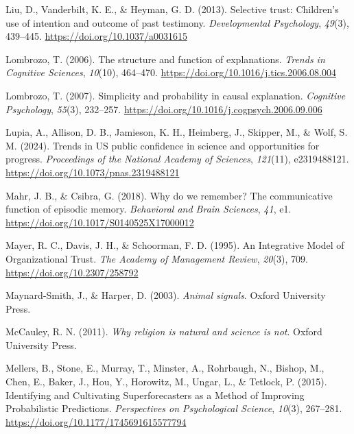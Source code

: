 \documentclass[
  jou,
  floatsintext,
  longtable,
  nolmodern,
  notxfonts,
  notimes,
  colorlinks=true,linkcolor=blue,citecolor=blue,urlcolor=blue]{apa7}
\newlength{\cslhangindent}
\newenvironment{CSLReferences}[2] %
 {\begin{list}{}{%
  \setlength{\itemindent}{0pt}
  \setlength{\leftmargin}{0pt}
  \setlength{\parsep}{0pt}
  \ifodd #1
   \setlength{\leftmargin}{\cslhangindent}
   \setlength{\itemindent}{-1\cslhangindent}
  \fi
  \setlength{\itemsep}{#2\baselineskip}}}
 {\end{list}}
\begin{document}
\begin{CSLReferences}{1}{0}
Liu, D., Vanderbilt, K. E., \& Heyman, G. D. (2013). Selective trust:
Children's use of intention and outcome of past testimony.
\emph{Developmental Psychology}, \emph{49}(3), 439--445.
\url{https://doi.org/10.1037/a0031615}

Lombrozo, T. (2006). The structure and function of explanations.
\emph{Trends in Cognitive Sciences}, \emph{10}(10), 464--470.
\url{https://doi.org/10.1016/j.tics.2006.08.004}

Lombrozo, T. (2007). Simplicity and probability in causal explanation.
\emph{Cognitive Psychology}, \emph{55}(3), 232--257.
\url{https://doi.org/10.1016/j.cogpsych.2006.09.006}

Lupia, A., Allison, D. B., Jamieson, K. H., Heimberg, J., Skipper, M.,
\& Wolf, S. M. (2024). Trends in US public confidence in science and
opportunities for progress. \emph{Proceedings of the National Academy of
Sciences}, \emph{121}(11), e2319488121.
\url{https://doi.org/10.1073/pnas.2319488121}

Mahr, J. B., \& Csibra, G. (2018). Why do we remember? The communicative
function of episodic memory. \emph{Behavioral and Brain Sciences},
\emph{41}, e1. \url{https://doi.org/10.1017/S0140525X17000012}

Mayer, R. C., Davis, J. H., \& Schoorman, F. D. (1995). An Integrative
Model of Organizational Trust. \emph{The Academy of Management Review},
\emph{20}(3), 709. \url{https://doi.org/10.2307/258792}

Maynard-Smith, J., \& Harper, D. (2003). \emph{Animal signals}. Oxford
University Press.

McCauley, R. N. (2011). \emph{Why religion is natural and science is
not}. Oxford University Press.

Mellers, B., Stone, E., Murray, T., Minster, A., Rohrbaugh, N., Bishop,
M., Chen, E., Baker, J., Hou, Y., Horowitz, M., Ungar, L., \& Tetlock,
P. (2015). Identifying and Cultivating Superforecasters as a Method of
Improving Probabilistic Predictions. \emph{Perspectives on Psychological
Science}, \emph{10}(3), 267--281.
\url{https://doi.org/10.1177/1745691615577794}


\end{CSLReferences}
\end{document}
